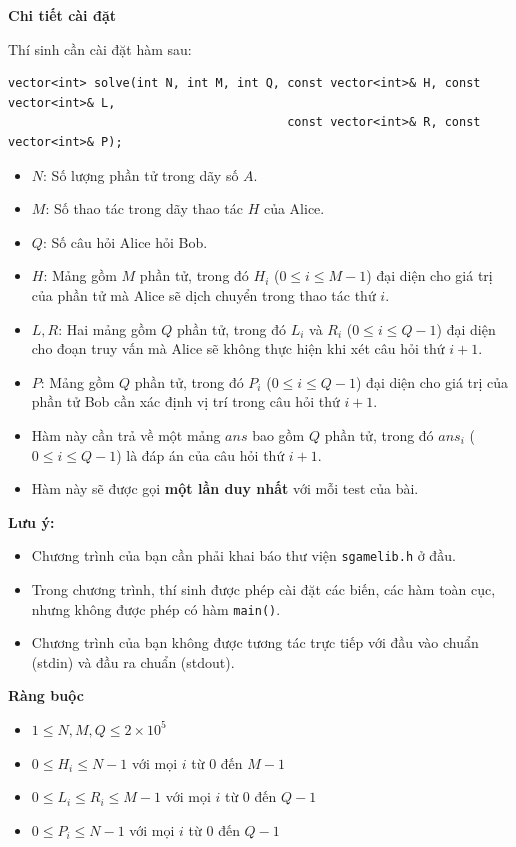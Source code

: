 \textbf{Chi tiết cài đặt}

Thí sinh cần cài đặt hàm sau:

\begin{lstlisting}
vector<int> solve(int N, int M, int Q, const vector<int>& H, const vector<int>& L,
                                       const vector<int>& R, const vector<int>& P);
\end{lstlisting}

\begin{itemize}
    \item $N$: Số lượng phần tử trong dãy số $A$.
    \item $M$: Số thao tác trong dãy thao tác $H$ của Alice.
    \item $Q$: Số câu hỏi Alice hỏi Bob.
    \item $H$: Mảng gồm $M$ phần tử, trong đó $H_i$ ($0\le i\le M-1$) đại diện cho giá trị của phần tử mà Alice sẽ dịch chuyển trong thao tác thứ $i$.
    \item $L, R$: Hai mảng gồm $Q$ phần tử, trong đó $L_i$ và $R_i$ ($0\le i\le Q-1$) đại diện cho đoạn truy vấn mà Alice sẽ không thực hiện khi xét câu hỏi thứ $i+1$.
    \item $P$: Mảng gồm $Q$ phần tử, trong đó $P_i$ ($0\le i\le Q-1$) đại diện cho giá trị của phần tử Bob cần xác định vị trí trong câu hỏi thứ $i+1$.
    \item Hàm này cần trả về một mảng $ans$ bao gồm $Q$ phần tử, trong đó $ans_i$ ($0\le i\le Q-1$) là đáp án của câu hỏi thứ $i+1$.
    \item Hàm này sẽ được gọi \textbf{một lần duy nhất} với mỗi test của bài.
\end{itemize}

\textbf{Lưu ý:}
\begin{itemize}
    \item Chương trình của bạn cần phải khai báo thư viện \texttt{sgamelib.h} ở đầu.
    \item Trong chương trình, thí sinh được phép cài đặt các biến, các hàm toàn cục, nhưng không được phép có hàm \texttt{main()}.
   \item Chương trình của bạn không được tương tác trực tiếp với đầu vào chuẩn (stdin) và đầu ra chuẩn (stdout).
\end{itemize}

\textbf{Ràng buộc}

\begin{itemize}
    \item $1\le N, M, Q \le 2\times 10^5$
    \item $0\le H_i \le N-1$ với mọi $i$ từ $0$ đến $M-1$
    \item $0\le L_i \le R_i \le M-1$ với mọi $i$ từ $0$ đến $Q-1$
    \item $0\le P_i \le N-1$ với mọi $i$ từ $0$ đến $Q-1$
\end{itemize}